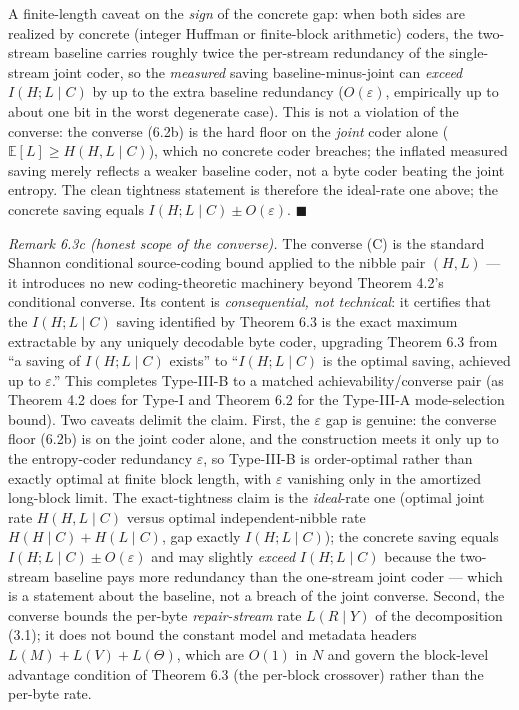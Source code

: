 \documentclass[
]{article}
\begin{document}
A finite-length caveat on the \emph{sign} of the concrete gap: when
both sides are realized by concrete (integer Huffman or finite-block
arithmetic) coders, the two-stream baseline carries roughly twice the
per-stream redundancy of the single-stream joint coder, so the
\emph{measured} saving baseline-minus-joint can \emph{exceed}
$I(H ; L \mid C)$ by up to the extra baseline redundancy ($O(\varepsilon)$,
empirically up to about one bit in the worst degenerate case). This is
not a violation of the converse: the converse (6.2b) is the hard floor
on the \emph{joint} coder alone ($\mathbb{E}[L] \geq H(H,L\mid C)$),
which no concrete coder breaches; the inflated measured saving merely
reflects a weaker baseline coder, not a byte coder beating the joint
entropy. The clean tightness statement is therefore the ideal-rate one
above; the concrete saving equals $I(H ; L \mid C) \pm O(\varepsilon)$.
\hfill$\blacksquare$

\emph{Remark 6.3c (honest scope of the converse).} The converse
(C) is the standard Shannon conditional source-coding bound applied
to the nibble pair $(H, L)$ --- it introduces no new coding-theoretic
machinery beyond Theorem 4.2's conditional converse. Its content is
\emph{consequential, not technical}: it certifies that the
$I(H ; L \mid C)$ saving identified by Theorem 6.3 is the exact
maximum extractable by any uniquely decodable byte coder, upgrading
Theorem 6.3 from ``a saving of $I(H;L\mid C)$ exists'' to ``$I(H;L
\mid C)$ is the optimal saving, achieved up to $\varepsilon$.'' This
completes Type-III-B to a matched achievability/converse pair (as
Theorem 4.2 does for Type-I and Theorem 6.2 for the Type-III-A
mode-selection bound). Two caveats delimit the claim. First, the
$\varepsilon$ gap is genuine: the converse floor (6.2b) is on the
joint coder alone, and the construction meets it only up to the
entropy-coder redundancy $\varepsilon$, so Type-III-B is order-optimal
rather than exactly optimal at finite block length, with $\varepsilon$
vanishing only in the amortized long-block limit. The exact-tightness
claim is the \emph{ideal}-rate one (optimal joint rate $H(H,L\mid C)$
versus optimal independent-nibble rate $H(H\mid C)+H(L\mid C)$, gap
exactly $I(H;L\mid C)$); the concrete saving equals
$I(H;L\mid C)\pm O(\varepsilon)$ and may slightly \emph{exceed}
$I(H;L\mid C)$ because the two-stream baseline pays more redundancy
than the one-stream joint coder --- which is a statement about the
baseline, not a breach of the joint converse.
Second, the converse bounds the per-byte \emph{repair-stream} rate
$L(R \mid Y)$ of the decomposition (3.1); it does not bound the
constant model and metadata headers $L(M) + L(V) + L(\Theta)$, which
are $O(1)$ in $N$ and govern the block-level advantage condition of
Theorem 6.3 (the per-block crossover) rather than the per-byte rate.
\end{document}
